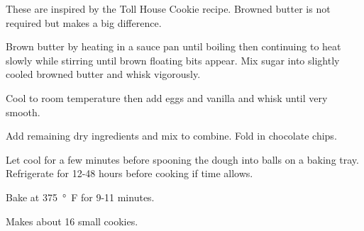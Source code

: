 
These are inspired by the Toll House Cookie recipe. Browned butter is
not required but makes a big difference.


Brown butter by heating in a sauce pan until boiling then continuing
to heat slowly while stirring until brown floating bits appear. Mix
sugar into slightly cooled browned butter and whisk vigorously.

\begin{ingredients}
\end{ingredients}

Cool to room temperature then add eggs and vanilla and whisk until
very smooth.

\begin{ingredients}
\end{ingredients}

Add remaining dry ingredients and mix to combine. Fold in chocolate
chips.

\begin{ingredients}
\end{ingredients}

Let cool for a few minutes before spooning the dough into balls on a
baking tray. Refrigerate for 12-48 hours before cooking if time
allows.

Bake at \SI{375}{°F} for 9-11 minutes.

Makes about 16 small cookies.
